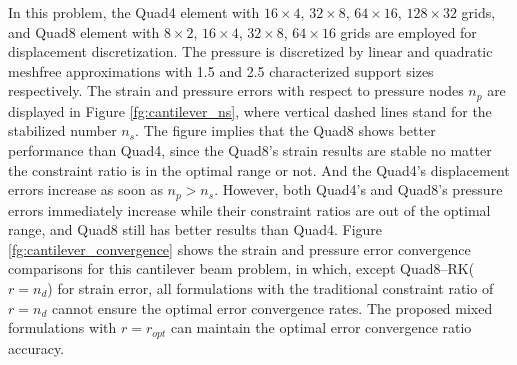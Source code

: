 In this problem, the Quad4 element with $16\times 4$, $32\times 8$, $64\times 16$, $128\times 32$ grids, and Quad8 element with $8\times 2$, $16\times 4$, $32\times 8$, $64\times 16$ grids are employed for displacement discretization. The pressure is discretized by linear and quadratic meshfree approximations with 1.5 and 2.5 characterized support sizes respectively.
The strain and pressure errors with respect to pressure nodes $n_p$ are displayed in Figure \ref{fg:cantilever_ns}, where \DIFaddbegin {}\DIFaddend vertical dashed lines stand for the stabilized number $n_s$. The figure implies that the Quad8 shows better performance than Quad4, since the Quad8's strain results are stable no matter the constraint ratio is in the optimal range or not. And the Quad4's displacement errors increase as soon as $n_p > n_s$. However, both Quad4's and Quad8's pressure errors immediately increase while their constraint ratios are out of the optimal range, and Quad8 still has better results than Quad4.
Figure \ref{fg:cantilever_convergence} shows the strain and pressure error convergence comparisons \DIFaddbegin {}\DIFaddend for this cantilever beam problem, in which, except Quad8--RK($r=n_d$) for strain error, all formulations with the traditional constraint ratio of $r=n_d$ cannot ensure the optimal error convergence rates. The proposed mixed formulations with $r=r_{opt}$ \DIFaddbegin {}\DIFaddend can maintain the optimal error convergence ratio \DIFaddbegin {}\DIFaddend accuracy.

